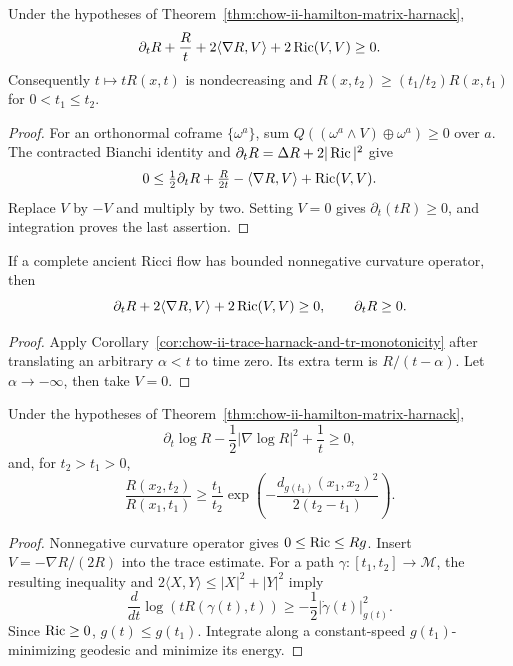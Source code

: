 \begin{corollary}
\label{cor:chow-ii-trace-harnack-and-tr-monotonicity}
Under the hypotheses of Theorem~\ref{thm:chow-ii-hamilton-matrix-harnack},
\[
\partial_tR+\frac Rt+2\langle\nabla R,V\rangle+2\operatorname{Ric}(V,V)\ge0.
\]
Consequently \(t\mapsto tR(x,t)\) is nondecreasing and
\(R(x,t_2)\ge(t_1/t_2)R(x,t_1)\) for \(0<t_1\le t_2\).
\end{corollary}
\begin{proof}
For an orthonormal coframe \(\{\omega^a\}\), sum
\(Q((\omega^a\wedge V)\oplus\omega^a)\ge0\) over \(a\).  The contracted
Bianchi identity and \(\partial_tR=\Delta R+2|\operatorname{Ric}|^2\) give
\[
0\le\tfrac12\partial_tR+\tfrac{R}{2t}-\langle\nabla R,V\rangle+\operatorname{Ric}(V,V).
\]
Replace \(V\) by \(-V\) and multiply by two.  Setting \(V=0\) gives
\(\partial_t(tR)\ge0\), and integration proves the last assertion.
\end{proof}

\begin{corollary}
\label{cor:chow-ii-ancient-trace-harnack}
If a complete ancient Ricci flow has bounded nonnegative curvature operator,
then
\[
\partial_tR+2\langle\nabla R,V\rangle+2\operatorname{Ric}(V,V)\ge0,
\qquad \partial_tR\ge0.
\]
\end{corollary}
\begin{proof}
Apply Corollary~\ref{cor:chow-ii-trace-harnack-and-tr-monotonicity} after
translating an arbitrary \(\alpha<t\) to time zero.  Its extra term is
\(R/(t-\alpha)\).  Let \(\alpha\to-\infty\), then take \(V=0\).
\end{proof}

\begin{corollary}
\label{cor:chow-ii-scalar-curvature-spacetime-comparison}
Under the hypotheses of Theorem~\ref{thm:chow-ii-hamilton-matrix-harnack},
\[
\partial_t\log R-\frac12|\nabla\log R|^2+\frac1t\ge0,
\]
and, for \(t_2>t_1>0\),
\[
\frac{R(x_2,t_2)}{R(x_1,t_1)}\ge\frac{t_1}{t_2}
\exp\!\left(-\frac{d_{g(t_1)}(x_1,x_2)^2}{2(t_2-t_1)}\right).
\]
\end{corollary}
\begin{proof}
Nonnegative curvature operator gives \(0\le\operatorname{Ric}\le Rg\).  Insert
\(V=-\nabla R/(2R)\) into the trace estimate.  For a path
\(\gamma:[t_1,t_2]\to\mathcal M\), the resulting inequality and
\(2\langle X,Y\rangle\le|X|^2+|Y|^2\) imply
\[
\frac d{dt}\log(tR(\gamma(t),t))\ge-\frac12|\dot\gamma(t)|_{g(t)}^2.
\]
Since \(\operatorname{Ric}\ge0\), \(g(t)\le g(t_1)\).  Integrate along a constant-speed
\(g(t_1)\)-minimizing geodesic and minimize its energy.
\end{proof}


